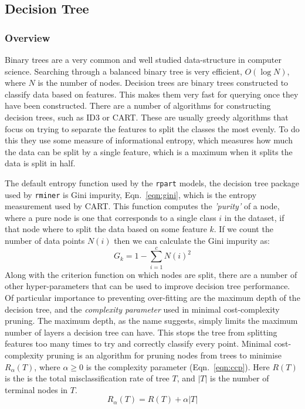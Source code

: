 \documentclass[12pt,a4paper,titlepage,twoside]{report}
\begin{document}
\subsection{Decision Tree}
	
\subsubsection*{Overview}
	Binary trees are a very common and well studied data-structure in computer science. Searching through a balanced binary tree is very efficient, $O(\log N)$, where $N$ is the number of nodes. Decision trees are binary trees constructed to classify data based on features\cite{ml-algorithmic-perspective}. This makes them very fast for querying once they have been constructed. There are a number of algorithms for constructing decision trees, such as ID3\cite{ID3} or CART\cite{CART}. These are usually greedy algorithms that focus on trying to separate the features to split the classes the most evenly. To do this they use some measure of informational entropy, which measures how much the data can be split by a single feature, which is a maximum when it splits the data is split in half\cite{info-entropy}. \par
	The default entropy function used by the \texttt{rpart} models, the decision tree package used by \texttt{rminer} is Gini impurity, Eqn.~\ref{eqn:gini}, which is the entropy measurement used by CART. This function computes the \textit{'purity'} of a node, where a pure node is one that corresponds to a single class $i$ in the dataset, if that node where to split the data based on some feature $k$. If we count the number of data points $N(i)$ then we can calculate the Gini impurity as:
	\begin{equation}
	G_k = 1 - \sum_{i=1}^c N(i)^2
	\label{eqn:gini}
	\end{equation}
	Along with the criterion function on which nodes are split, there are a number of other hyper-parameters that can be used to improve decision tree performance. Of particular importance to preventing over-fitting are the maximum depth of the decision tree, and the \textit{complexity parameter} used in minimal cost-complexity pruning. The maximum depth, as the name suggests, simply limits the maximum number of layers a decision tree can have. This stops the tree from splitting features too many times to try and correctly classify every point. Minimal cost-complexity pruning is an algorithm for pruning nodes from trees to minimise $R_\alpha(T)$, where $\alpha \geq 0$ is the complexity parameter (Eqn.~\ref{eqn:ccp}). Here $R(T)$ is the is the total misclassification rate of tree $T$, and $|T|$ is the number of terminal nodes in $T$.
	\begin{equation}
		R_\alpha(T) = R(T) + \alpha|T|
	\label{eqn:ccp}
	\end{equation}
	
\end{document}
